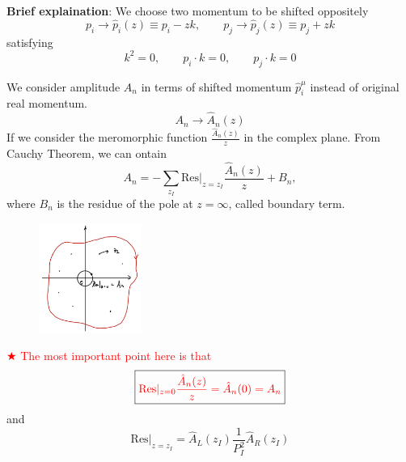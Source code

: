\documentclass{beamer}
\begin{document}
\begin{frame}
    
    \textbf{Brief explaination}: We choose two momentum to be shifted oppositely 
    \begin{equation*}
        p_i\rightarrow\hat{p}_i(z)\equiv p_i-zk,\qquad p_j\rightarrow\hat{p}_j(z)\equiv p_j+zk
    \end{equation*}
    satisfying 
    \begin{equation*}
        k^2=0,\qquad p_i\cdot k=0,\qquad p_j\cdot k=0
    \end{equation*}
    
    We consider amplitude $A_n$ in terms of shifted momentum $\hat{p}_i^\mu$ instead of original real momentum. 
    \begin{equation*}
        A_n \longrightarrow \hat{A}_n(z)
    \end{equation*}
    \pause
    If we consider the meromorphic function $\frac{\hat{A}_n(z)}{z}$ in the complex plane.
    From Cauchy Theorem, we can ontain
    \begin{equation*}
        A_n=-\sum_{z_I}\textrm{Res}|_{z=z_I}\frac{\hat{A}_n(z)}{z}+B_n,
    \end{equation*}
    where $B_n$ is the residue of the pole at $z=\infty$, called boundary term.
\end{frame}
\begin{frame}
   
    \vspace{-1em}
    \begin{figure}[htbp]
        \centering
        \includegraphics[width=0.3\textwidth]{CT.png}
    \end{figure}
    \vspace{-1.5em}
   \textcolor{red}{$\bigstar$ The most important point here is that}
    \begin{equation*}
        \boxed{\color{red}\mathrm{Res}|_{z=0}\frac{\hat{A}_n(z)}{z}=\hat{A}_n(0)=A_n}
    \end{equation*}
    and 
\begin{equation*}
    \mathrm{Res}|_{z=z_I}=\hat{A}_L(z_I)\frac{1}{P_I^2}\hat{A}_R(z_I)
\end{equation*}
\end{frame}
\end{document}
